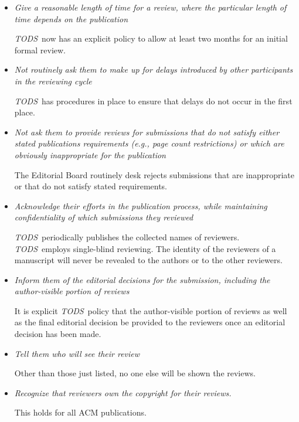 \documentclass{article}
\newcommand{\tods}{{\em TODS\/}}
\begin{document}
\begin{itemize}
  The \tods\ Editorial Board policy is explicit on this right.

\item {\em Give a reasonable length of time for a review, where the
  particular length of time depends on the publication}

   \tods\ now has an explicit policy to allow at least two months for an initial
   formal review.

\item {\em Not routinely ask them to make up for delays introduced by other
  participants in the reviewing cycle}

  \tods\ has procedures in place to ensure that delays do not occur in the
  first place.

\item {\em Not ask them to provide reviews for submissions that do not
  satisfy either stated publications requirements (e.g., page count
  restrictions) or which are obviously inappropriate for the publication}

  The Editorial Board routinely desk rejects submissions that are
  inappropriate or that do not satisfy stated requirements.

\item {\em Acknowledge their efforts in the publication process, while
  maintaining confidentiality of which submissions they reviewed}

  \tods\ periodically publishes the collected names of reviewers.
  \tods\ employs single-blind reviewing. The identity of the reviewers of a
  manuscript will never be revealed to the authors or to the other reviewers.

\item {\em Inform them of the editorial decisions for the submission,
  including the author-visible portion of reviews}

  It is explicit \tods\ policy that the author-visible portion of reviews as
  well as the final editorial decision be provided to the reviewers once an
  editorial decision has been made. 

\item {\em Tell them who will see their review}

  Other than those just listed, no one else will be shown the reviews. 

\item {\em Recognize that reviewers own the copyright for their reviews.}

  This holds for all ACM publications.
\end{itemize}
\end{document}
